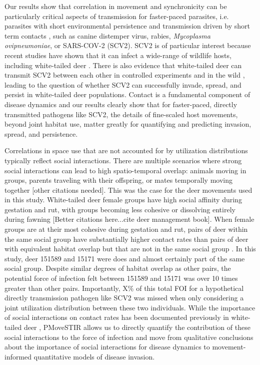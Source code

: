 \documentclass[letterpaper]{article}
\begin{document}

Our results show that correlation in movement and synchronicity can be particularly critical aspects of transmission for faster-paced parasites, i.e. parasites with short environmental persistence and transmission driven by short term contacts \citep[cf.][]{Dougherty2018,Manlove2022}, such as canine distemper virus, rabies, \emph{Mycoplasma ovipneumoniae}, or SARS-COV-2 (SCV2). SCV2 is of particular interest because recent studies have shown that it can infect a wide-range of wildlife hosts, including white-tailed deer \citep{Palmer2021,Hale2022}. There is also evidence that white-tailed deer can transmit SCV2 between each other in controlled experiments and in the wild \citep{Martins2022,Hale2022}, leading to the question of whether SCV2 can successfully invade, spread, and persist in white-tailed deer populations. Contact is a fundamental component of disease dynamics and our results clearly show that for faster-paced, directly transmitted pathogens like SCV2, the details of fine-scaled host movements, beyond joint habitat use, matter greatly for quantifying and predicting invasion, spread, and persistence. 

Correlations in space use that are not accounted for by utilization distributions typically reflect social interactions.  There are multiple scenarios where strong social interactions can lead to high spatio-temporal overlap: animals moving in groups, parents traveling with their offspring, or mates temporally moving together \citep{Yang2021} [other citations needed]. This was the case for the deer movements used in this study. White-tailed deer female groups have high social affinity during gestation and rut, with groups becoming less cohesive or dissolving entirely during fawning \citep{Koen2017} [Better citations here...cite deer management book].  When female groups are at their most cohesive during gestation and rut, pairs of deer within the same social group have substantially higher contact rates than pairs of deer with equivalent habitat overlap but that are not in the same social group \citep{Schauber2007a,Kjaer2008,Schauber2015a,Grear2010}.  In this study, deer 151589 and 15171 were does and almost certainly part of the same social group. Despite similar degrees of habitat overlap as other pairs, the potential force of infection felt between 151589 and 15171 was over 10 times greater than other pairs.  Importantly, X\% of this total FOI for a hypothetical directly transmission pathogen like SCV2 was missed when only considering a joint utilization distribution between these two individuals.  While the importance of social interactions on contact rates has been documented previously in white-tailed deer \citep{Grear2010,Schauber2015a}, PMoveSTIR allows us to directly quantify the contribution of these social interactions to the force of infection and move from qualitative conclusions about the importance of social interactions for disease dynamics to movement-informed quantitative models of disease invasion.
\end{document}
